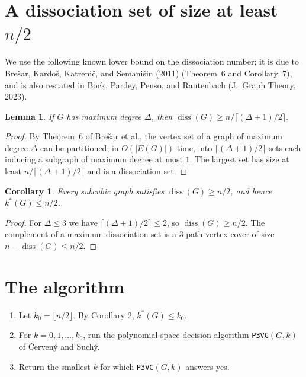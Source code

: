 \documentclass[11pt]{article}
\newtheorem{lemma}{Lemma}
\newtheorem{corollary}{Corollary}
\begin{document}
\section{A dissociation set of size at least $n/2$}

We use the following known lower bound on the dissociation number; it is due to
Bre\v{s}ar, Kardo\v{s}, Katreni\v{c}, and Semani\v{s}in (2011) (Theorem~6 and
Corollary~7), and is also restated in Bock, Pardey, Penso, and Rautenbach
(J.\ Graph Theory, 2023).

\begin{lemma}
If $G$ has maximum degree $\Delta$, then
$\operatorname{diss}(G) \ge n/\lceil(\Delta+1)/2\rceil$.
\end{lemma}

\begin{proof}
By Theorem~6 of Bre\v{s}ar et al., the vertex set of a graph of maximum degree
$\Delta$ can be partitioned, in $O(|E(G)|)$ time, into $\lceil(\Delta+1)/2\rceil$
sets each inducing a subgraph of maximum degree at most $1$. The largest set has
size at least $n/\lceil(\Delta+1)/2\rceil$ and is a dissociation set.
\end{proof}

\begin{corollary}
Every subcubic graph satisfies $\operatorname{diss}(G) \ge n/2$, and hence
$k^*(G) \le n/2$.
\end{corollary}

\begin{proof}
For $\Delta \le 3$ we have $\lceil(\Delta+1)/2\rceil \le 2$, so
$\operatorname{diss}(G) \ge n/2$. The complement of a maximum dissociation set is a
3-path vertex cover of size $n-\operatorname{diss}(G) \le n/2$.
\end{proof}

\section{The algorithm}

\begin{enumerate}
\item Let $k_0 = \lfloor n/2 \rfloor$. By Corollary 2, $k^*(G) \le k_0$.
\item For $k = 0,1,\dots,k_0$, run the polynomial-space decision algorithm
      \texttt{P3VC}$(G,k)$ of \v{C}erven\'y and Such\'y.
\item Return the smallest $k$ for which \texttt{P3VC}$(G,k)$ answers yes.
\end{enumerate}
\end{document}
